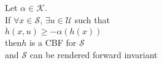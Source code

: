 \documentclass[preview]{standalone}
\begin{document}
\begin{center}
Let $\alpha \in \mathcal{K}$.\\If $\forall x \in \mathcal{S}$, $\exists u \in \mathcal{U}$ such that \\$\dot h(x, u) \geq - \alpha(h(x))$ \\then$h$ is a CBF for $\mathcal{S}$\\and $\mathcal{S}$ can be rendered forward invariant
\end{center}
\end{document}

